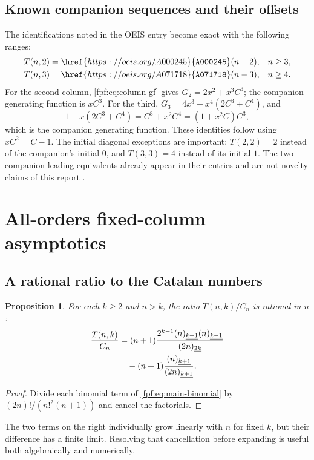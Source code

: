 \documentclass[11pt]{article}
\numberwithin{equation}{section}
\newtheorem{proposition}[theorem]{Proposition}
\theoremstyle{definition}
\newcommand{\fall}[2]{(#1)_{\underline{#2}}}
\newcommand{\Oeis}[1]{\href{https://oeis.org/#1}{\texttt{#1}}}
\begin{document}
\subsection{Known companion sequences and their offsets}
The identifications noted in the OEIS entry become exact with the following
ranges:
\begin{align}\label{fpf:eq:companions}
 T(n,2)&=\Oeis{A000245}(n-2), && n\ge3,\notag\\
 T(n,3)&=\Oeis{A071718}(n-3), && n\ge4.
\end{align}
For the second column, \eqref{fpf:eq:column-gf} gives $G_2=2x^2+x^3C^3$;
the companion generating function is $xC^3$. For the third,
$G_3=4x^3+x^4(2C^3+C^4)$, and
\[
 1+x(2C^3+C^4)=C^3+x^2C^4=(1+x^2C)C^3,
\]
which is the companion generating function. These identities follow using
$xC^2=C-1$. The initial diagonal exceptions are important:
$T(2,2)=2$ instead of the companion's initial $0$, and $T(3,3)=4$ instead
of its initial $1$. The two companion leading equivalents already appear
in their entries and are not novelty claims of this report
\cite{oeis245,oeis71718}.

\section{All-orders fixed-column asymptotics}

\subsection{A rational ratio to the Catalan numbers}
\begin{proposition}\label{fpf:prop:rational-ratio}
For each $k\ge2$ and $n>k$, the ratio $T(n,k)/C_n$ is rational in $n$:
\begin{align}\label{fpf:eq:rational-ratio}
 \frac{T(n,k)}{C_n}
 &=(n+1)\frac{2^{k-1}\fall{n}{k+1}\fall{n}{k-1}}
                      {\fall{2n}{2k}}\notag\\
 &\quad -(n+1)\frac{\fall{n}{k+1}}{\fall{2n}{k+1}}.
\end{align}
\end{proposition}
\begin{proof}
Divide each binomial term of \eqref{fpf:eq:main-binomial} by
$(2n)!/(n!^2(n+1))$ and cancel the factorials.
\end{proof}
The two terms on the right individually grow linearly with $n$ for fixed
$k$, but their difference has a finite limit. Resolving that cancellation
before expanding is useful both algebraically and numerically.
\end{document}

